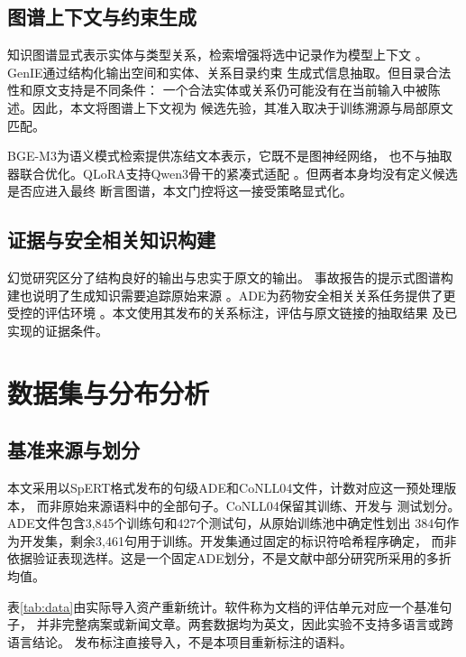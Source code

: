 \documentclass[12pt,a4paper,fontset=none]{ctexart}
\begin{document}
\subsection{图谱上下文与约束生成}
知识图谱显式表示实体与类型关系，检索增强将选中记录作为模型上下文
\cite{hogan2021kg,lewis2020rag}。GenIE通过结构化输出空间和实体、关系目录约束
生成式信息抽取\cite{josifoski2022genie}。但目录合法性和原文支持是不同条件：
一个合法实体或关系仍可能没有在当前输入中被陈述。因此，本文将图谱上下文视为
候选先验，其准入取决于训练溯源与局部原文匹配。

BGE-M3为语义模式检索提供冻结文本表示\cite{chen2024bgem3}，它既不是图神经网络，
也不与抽取器联合优化。QLoRA支持Qwen3骨干的紧凑式适配
\cite{dettmers2023qlora,qwen2025qwen3}。但两者本身均没有定义候选是否应进入最终
断言图谱，本文门控将这一接受策略显式化。

\subsection{证据与安全相关知识构建}
幻觉研究区分了结构良好的输出与忠实于原文的输出\cite{ji2023hallucination}。
事故报告的提示式图谱构建也说明了生成知识需要追踪原始来源
\cite{liu2025llmaccidentkg}。ADE为药物安全相关关系任务提供了更受控的评估环境
\cite{gurulingappa2012ade}。本文使用其发布的关系标注，评估与原文链接的抽取结果
及已实现的证据条件。

\section{数据集与分布分析}
\label{sec:data}
\subsection{基准来源与划分}
本文采用以SpERT格式发布的句级ADE和CoNLL04文件，计数对应这一预处理版本，
而非原始来源语料中的全部句子。CoNLL04保留其训练、开发与
测试划分。ADE文件包含3,845个训练句和427个测试句，从原始训练池中确定性划出
384句作为开发集，剩余3,461句用于训练。开发集通过固定的标识符哈希程序确定，
而非依据验证表现选样。这是一个固定ADE划分，不是文献中部分研究所采用的多折均值。

表\ref{tab:data}由实际导入资产重新统计。软件称为文档的评估单元对应一个基准句子，
并非完整病案或新闻文章。两套数据均为英文，因此实验不支持多语言或跨语言结论。
发布标注直接导入，不是本项目重新标注的语料。
\begin{table}[htbp]
\centering\small\setlength{\tabcolsep}{4pt}
\caption{实际实验划分的数据清单。依次列出数据集、划分、句数、实体数、关系数与
平均长度；长度为重建原文中的空白分隔词元数。}
\label{tab:data}

\end{table}
\end{document}
